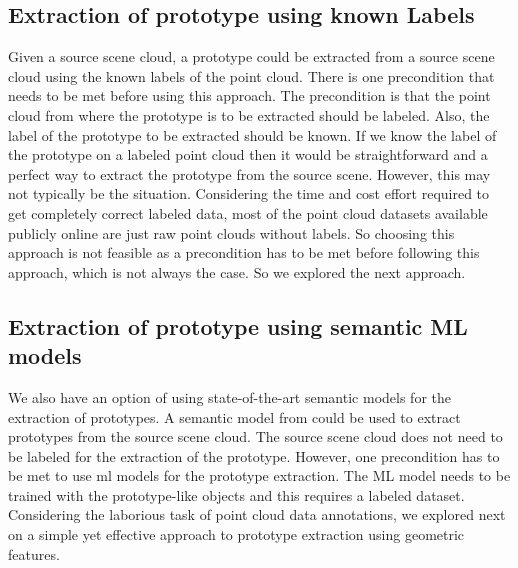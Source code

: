 \subsection{Extraction of prototype using known Labels}
Given a source scene cloud, a prototype could be extracted from a source scene cloud using the known labels of the point cloud. There is one precondition that needs to be met before using this approach. The precondition is that the point cloud from where the prototype is to be extracted should be labeled. Also, the label of the prototype to be extracted should be known. If we know the label of the prototype on a labeled point cloud then it would be straightforward and a perfect way to extract the prototype from the source scene. However, this may not typically be the situation. Considering the time and cost effort required to get completely correct labeled data, most of the point cloud datasets available publicly online are just raw point clouds without labels. So choosing this approach is not feasible as a precondition has to be met before following this approach, which is not always the case. So we explored the next approach.

\subsection{Extraction of prototype using semantic ML models}
We also have an option of using state-of-the-art semantic models for the extraction of prototypes. A semantic model from \parencite{Chen2022} could be used to extract prototypes from the source scene cloud. The source scene cloud does not need to be labeled for the extraction of the prototype. However, one precondition has to be met to use \acrshort{ml} models for the prototype extraction. The ML model needs to be trained with the prototype-like objects and this requires a labeled dataset. Considering the laborious task of point cloud data annotations, we explored next on a simple yet effective approach to prototype extraction using geometric features.

